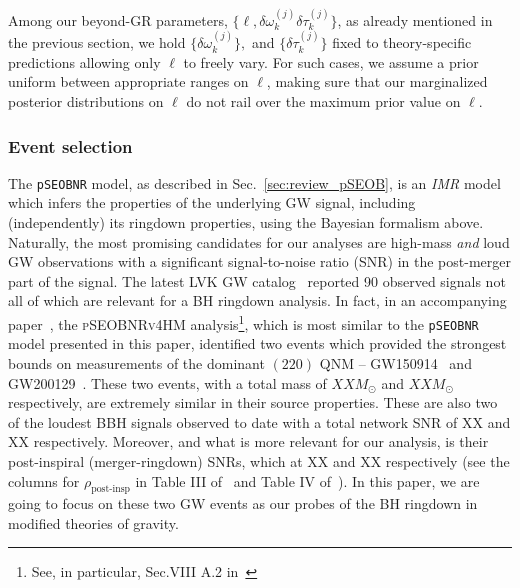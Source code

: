 \documentclass[twocolumn,prd,aps,superscriptaddress,preprintnumbers,tightenlines,showpacs,nofootinbib,amsfonts,amsmath,longbibliography]{revtex4-1}
\newcommand{\Mo}{M_{\odot}}
\newcommand{\pSEOB}{\texttt{pSEOBNR}}
\begin{document}
Among our beyond-GR parameters, $\{\ell, \delta \omega_k^{(j)}\delta \tau_k^{(j)}\}$,
as already mentioned in the previous section, we hold $\{\delta \omega_k^{(j)}\},$
and $\{\delta \tau_k^{(j)}\}$ fixed to theory-specific predictions allowing only $\ell$
to freely vary.
%
For such cases, we assume a prior uniform between appropriate ranges on $\ell$,
making sure that our marginalized posterior distributions on $\ell$ do not rail
over the maximum prior value on $\ell$.


\subsubsection{Event selection}

The \pSEOB{} model, as described in Sec.~\ref{sec:review_pSEOB}, is an
\emph{IMR} model which infers the properties of the underlying GW signal,
including (independently) its ringdown properties, using the Bayesian formalism
above. Naturally, the most promising candidates for our analyses are high-mass
\emph{and} loud GW observations with a significant signal-to-noise ratio (SNR)
in the post-merger part of the signal.
%
The latest LVK GW catalog~\cite{LIGOScientific:2021djp} reported 90 observed
signals not all of which are relevant for a BH ringdown analysis. In fact, in
an accompanying paper~\cite{LIGOScientific:2021sio}, the \textsc{pSEOBNRv4HM}
analysis\footnote{See, in particular, Sec.VIII A.2
in~\cite{LIGOScientific:2021sio}}, which is most similar to the \pSEOB{} model
presented in this paper, identified two events which provided the strongest
bounds on measurements of the dominant $(220)$ QNM --
GW150914~\cite{LIGOScientific:2016aoc} and
GW200129~\cite{LIGOScientific:2021djp}.
%
These two events, with a total mass of $XX \Mo$ and $XX \Mo$ respectively, are
extremely similar in their source properties. These are also two of the loudest
BBH signals observed to date with a total network SNR of XX and XX
respectively.
%
Moreover, and what is more relevant for our analysis, is their post-inspiral
(merger-ringdown) SNRs, which at XX and XX respectively (see the columns for
$\rho_{\text{post-insp}}$ in Table III of~\cite{LIGOScientific:2019fpa} and
Table IV of~\cite{LIGOScientific:2021sio}).
%
In this paper, we are going to focus on these two GW events as our probes of
the BH ringdown in modified theories of gravity.
\end{document}
